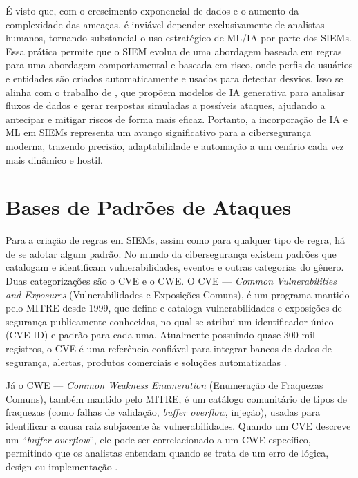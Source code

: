 É visto que, com o crescimento exponencial de dados e o aumento da complexidade das ameaças, é inviável depender exclusivamente de analistas humanos, tornando substancial o uso estratégico de ML/IA por parte dos SIEMs.
Essa prática permite que o SIEM evolua de uma abordagem baseada em regras para uma abordagem comportamental e baseada em risco, onde perfis de usuários e entidades são criados automaticamente e usados para detectar desvios. 
Isso se alinha com o trabalho de , que propõem modelos de IA generativa para analisar fluxos de dados e gerar respostas simuladas a possíveis ataques, ajudando a antecipar e mitigar riscos de forma mais eficaz. 
Portanto, a incorporação de IA e ML em SIEMs representa um avanço significativo para a cibersegurança moderna, trazendo precisão, adaptabilidade e automação a um cenário cada vez mais dinâmico e hostil.


\section{Bases de Padrões de Ataques}

Para a criação de regras em SIEMs, assim como para qualquer tipo de regra, há de se adotar algum padrão.
No mundo da cibersegurança existem padrões que catalogam e identificam vulnerabilidades, eventos e outras categorias do gênero. 
Duas categorizações são o CVE e o CWE.
O CVE --- \textit{Common Vulnerabilities and Exposures} (Vulnerabilidades e Exposições Comuns), é um programa mantido pelo MITRE desde 1999, que define e cataloga vulnerabilidades e exposições de segurança publicamente conhecidas, no qual se atribui um identificador único (CVE-ID) e padrão para cada uma.
Atualmente possuindo quase 300 mil registros, o CVE é uma referência confiável para integrar bancos de dados de segurança, alertas, produtos comerciais e soluções automatizadas \cite{NIST_CVE_Process, CVE_History}.

Já o CWE --- \textit{Common Weakness Enumeration} (Enumeração de Fraquezas Comuns), também mantido pelo MITRE, é um catálogo comunitário de tipos de fraquezas (como falhas de validação, \textit{buffer overflow}, injeção), usadas para identificar a causa raiz subjacente às vulnerabilidades. 
Quando um CVE descreve um ``\textit{buffer overflow}'', ele pode ser correlacionado a um CWE específico, permitindo que os analistas entendam quando se trata de um erro de lógica, design ou implementação \cite{CWE_About, CWE_Usage_Guidance}.

